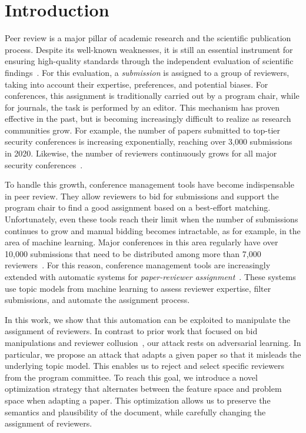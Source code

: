 \documentclass[letterpaper,twocolumn,10pt]{article}
\begin{document}
\section{Introduction}
\label{sec:introduction}

Peer review is a major pillar of academic research and the scientific publication process. Despite its well-known weaknesses, it is still an essential instrument for ensuring high-quality standards through the independent evaluation of scientific findings~\cite{soneji-22-experts, misc-nips, misc-esa}. For this evaluation, a \emph{submission} is assigned to a group of reviewers, taking into account their expertise, preferences, and potential biases. For conferences, this assignment is traditionally carried out by a program chair, while for journals, the task is performed by an editor. This mechanism has proven effective in the past, but is becoming increasingly difficult to realize as research communities grow. For example, the number of papers submitted to top-tier security conferences is increasing exponentially, reaching over 3,000 submissions in 2020. Likewise, the number of reviewers continuously grows for all major security conferences~\citep{misc-circus}.

To handle this growth, conference management tools have become indispensable in peer review. They allow reviewers to bid for submissions and support the program chair to find a good assignment based on a best-effort matching. Unfortunately, even these tools reach their limit when the number of submissions continues to grow and manual bidding becomes intractable, as for example, in the area of machine learning. Major conferences in this area regularly have over 10,000 submissions that need to be distributed among more than 7,000 reviewers~\cite{misc-neurips}. For this reason, conference management tools are increasingly extended with automatic systems for \emph{paper-reviewer assignment}~\cite{misc-autobid, charlin-13-toronto}. These systems use topic models from machine learning to assess reviewer expertise, filter submissions, and automate the assignment process. 

In this work, we show that this automation can be exploited to manipulate the assignment of reviewers. In contrast to prior work that focused on bid manipulations and reviewer collusion~\citep{jecmen-20-mitigating, wu-21-making}, our attack rests on adversarial learning. In particular, we propose an attack that adapts a given paper so that it misleads the underlying topic model. This enables us to reject and select specific reviewers from the program committee. To reach this goal, we introduce a novel optimization strategy that alternates between the feature space and problem space when adapting a paper. This optimization allows us to preserve the semantics and plausibility of the document, while carefully changing the assignment of reviewers.
\end{document}
